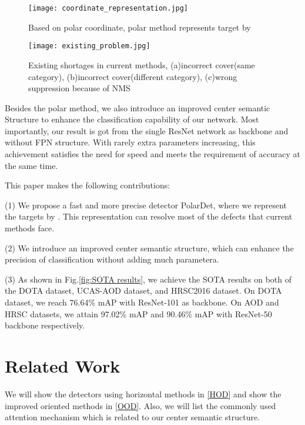 \documentclass[10pt,twocolumn]{article}
\begin{document}
\begin{figure}[t]
	\centering
	\texttt{[image: coordinate\_representation.jpg]}	
	\caption{Based on polar coordinate, polar method represents target by }
	\label{fig:coordinate representation}
\end{figure}

\begin{figure}[t]
	\centering
	\texttt{[image: existing\_problem.jpg]}	
	\caption{Existing shortages in current methods, (a)incorrect cover(same category), (b)incorrect cover(different category), (c)wrong suppression because of NMS}
	\label{fig:existing problem}
\end{figure}

Besides the polar method, we also introduce an improved center semantic Structure to enhance the classification capability of our network. Most importantly, our result is got from the single ResNet \cite{he2016deep} network as backbone and without FPN structure. With rarely extra parameters increasing, this achievement satisfies the need for speed and meets the requirement of accuracy at the same time.

This paper makes the following contributions:

(1) We propose a fast and more precise detector PolarDet, where we represent the targets by . This representation can resolve most of the defects that current methods face. 

(2) We introduce an improved center semantic structure, which can enhance the precision of classification without adding much parametera.

(3) As shown in Fig.\ref{fig:SOTA results}, we achieve the SOTA results on both of the DOTA \cite{xia2018dota} dataset, UCAS-AOD \cite{li2019feature} dataset, and HRSC2016 \cite{liu2016ship} dataset. On DOTA dataset, we reach 76.64\% mAP with ResNet-101 as backbone. On AOD and HRSC datasets, we attain 97.02\% mAP and 90.46\% mAP with ResNet-50 backbone respectively.

\section{Related Work}\label{Related_Work}

We will show the detectors using horizontal methods in \ref{HOD} and show the improved oriented methods in \ref{OOD}. Also, we will list the commonly used attention mechanism which is related to our center semantic structure.
\end{document}
